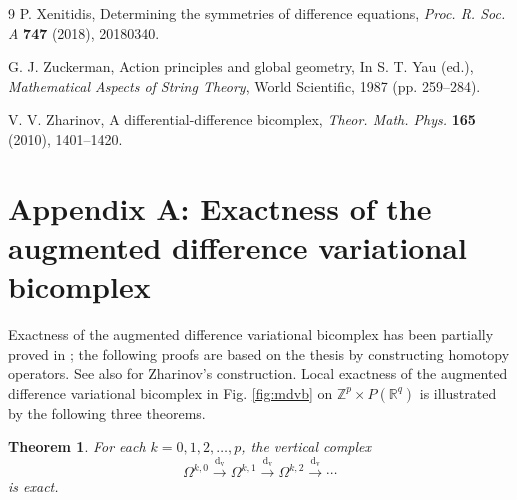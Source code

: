 \documentclass[11pt]{article} %
\numberwithin{equation}{section}
\newcommand{\upd}{\operatorname{d}}
\newcommand{\upv}{\operatorname{v}}
\newcommand{\dv}{\upd_{\upv}\!}
\theoremstyle{plain}
\newtheorem{thm}{Theorem}[section]
\theoremstyle{definition}
\begin{document}
\begin{thebibliography}{9}
 P.  Xenitidis, Determining the symmetries of difference equations, {\it Proc. R. Soc. A} {\bf 747} (2018),  20180340.

 G. J. Zuckerman, Action principles and global geometry, In S. T. Yau (ed.), {\it Mathematical Aspects of String Theory}, World Scientific, 1987 (pp. 259--284). 

 V. V. Zharinov, A differential-difference bicomplex, {\it Theor. Math. Phys.} {\bf 165} (2010), 1401--1420.

\end{thebibliography}

\clearpage

\appendix


\section*{Appendix A: Exactness of the augmented difference variational bicomplex}\renewcommand{\thesection}{A} 

Exactness of the augmented  difference variational bicomplex has been partially  proved in
\cite{HyMa2004,Ku1985}; the following proofs are based on the thesis \cite{Pe2013} by  constructing homotopy operators.  See also \cite{Zh2010} for Zharinov's construction. Local exactness of the augmented difference variational bicomplex in Fig. \ref{fig:mdvb} on
$\mathbb{Z}^p\times P(\mathbb{R}^q)$ is illustrated by the
following three theorems.

\begin{thm}
For each $k=0,1,2,\ldots,p$, the vertical complex
\begin{equation*}
\Omega^{k,0}\stackrel{\dv }{\longrightarrow}
\Omega^{k,1}\stackrel{\dv }{\longrightarrow}
\Omega^{k,2}\stackrel{\dv }{\longrightarrow}
\cdots
\end{equation*}
is exact.
\end{thm}
\end{document}

